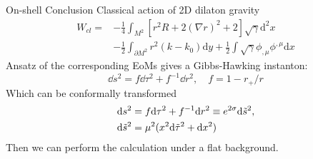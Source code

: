 \documentclass{beamer}
\begin{document}
\begin{frame}{On-shell Conclusion}
    Classical action of 2D dilaton gravity
    \begin{equation*}
    \begin{split}
        W_{cl}=&-\frac{1}{4}\int_{M^2}[r^2R+2(\nabla r)^2+2]\sqrt{\gamma}\mathrm{d}^2x\\
        &-\frac{1}{2}\int_{\partial M^2}r^2(k-k_0)\mathrm{d}y+\frac{1}{2}\int\sqrt{\gamma}\phi_{,\mu}\phi^{,\mu}\mathrm{d}x
    \end{split}
    \end{equation*}
    Ansatz of the corresponding EoMs gives a Gibbs-Hawking instanton:
    \begin{equation*}
        \dd s^2=f\dd \tau^2+f^{-1}\dd r^2,\quad f=1-r_+/r
    \end{equation*}
    Which can be conformally transformed
      \begin{equation*}
        \begin{split}
            &\mathrm{d}s^2=f\mathrm{d}\tau^2+f^{-1}\mathrm{d}r^2 \equiv e^{2\sigma}\mathrm{d}\Tilde{s}^2,\\
            &\mathrm{d}\Tilde{s}^2=\mu^2(x^2\mathrm{d}\Tilde{\tau}^2+\mathrm{d}x^2)
        \end{split}
    \end{equation*}
    Then we can perform the calculation under a flat background.
\end{frame}
\end{document}
